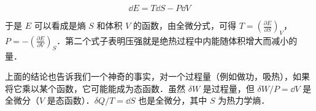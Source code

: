 \begin{equation}
\dd E=T\dd S-P\dd V
\end{equation}

于是 $E$ 可以看成是熵 $S$ 和体积 $V$ 的函数，由全微分式，可得 $T=\left(\frac{\partial E}{\partial S}\right)_V$，$P=-\left(\frac{\partial E}{\partial V}\right)_S$．第二个式子表明压强就是绝热过程中内能随体积增大而减小的量．

上面的结论也告诉我们一个神奇的事实，对一个过程量（例如做功，吸热），如果将它乘以某个函数，它可能能成为态函数．虽然 $\delta W$ 是过程量，但 $\delta W/P=\dd V$ 是全微分（$V$ 是态函数）．$\delta Q/T=\dd S$ 也是全微分，其中 $S$ 为热力学熵．